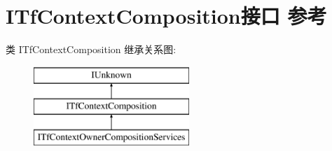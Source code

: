 \hypertarget{interface_i_tf_context_composition}{}\section{I\+Tf\+Context\+Composition接口 参考}
\label{interface_i_tf_context_composition}
类 I\+Tf\+Context\+Composition 继承关系图\+:\begin{figure}[H]
\begin{center}
\leavevmode
\includegraphics[height=3.000000cm]{interface_i_tf_context_composition}
\end{center}
\end{figure}
